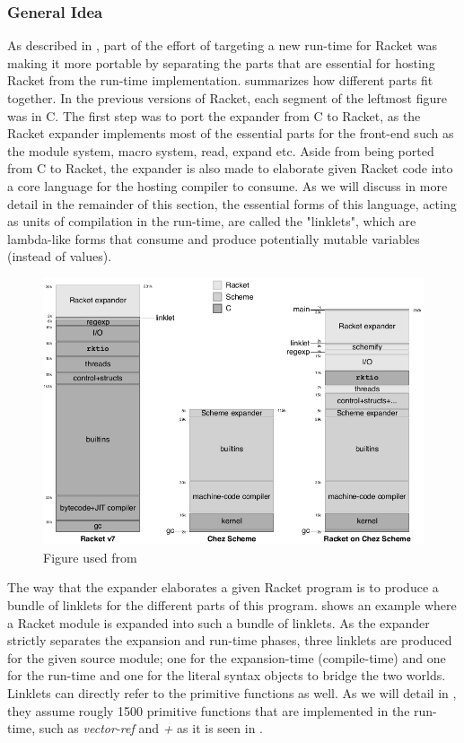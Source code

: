 \subsubsection{General Idea}
\label{subsec:racket-expand}

As described in , part of the effort of targeting a
new run-time for Racket was making it more portable by separating the
parts that are essential for hosting Racket from the run-time
implementation.  summarizes how different
parts fit together. In the previous versions of Racket, each segment
of the leftmost figure was in C. The first step was to port the
expander from C to Racket, as the Racket expander implements most of
the essential parts for the front-end such as the module system, macro
system, read, expand etc. Aside from being ported from C to Racket,
the expander is also made to elaborate given Racket code into a core
language for the hosting compiler to consume. As we will discuss in
more detail in the remainder of this section, the essential forms of
this language, acting as units of compilation in the run-time, are
called the "linklets", which are lambda-like forms that consume and
produce potentially mutable variables (instead of values).

\begin{figure}[tbp]
  \centering
  \includegraphics[scale=0.3]{img/racket-portable}
  \caption{Figure used from \cite{racket-on-chez-19}}
  \label{fig:racket-portable}
\end{figure}


The way that the expander elaborates a given Racket program is to
produce a bundle of linklets for the different parts of this
program.  shows an example where a
Racket module is expanded into such a bundle of linklets. As the
expander strictly separates the expansion and run-time phases, three
linklets are produced for the given source module; one for the
expansion-time (compile-time) and one for the run-time and one for the
literal syntax objects to bridge the two worlds. Linklets can directly
refer to the primitive functions as well. As we will detail in
, they assume rougly 1500 primitive functions
that are implemented in the run-time, such as \emph{vector-ref} and
\emph{+} as it is seen in .


